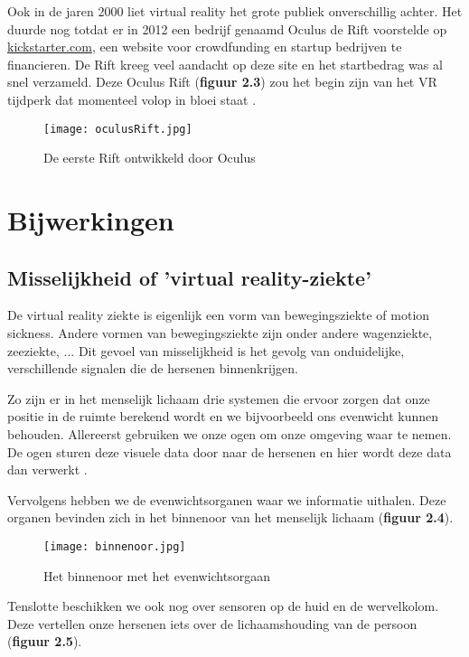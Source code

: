 Ook in de jaren 2000 liet virtual reality het grote publiek onverschillig achter. Het duurde nog totdat er in 2012 een bedrijf genaamd Oculus de Rift voorstelde op \href{https://www.kickstarter.com/}{kickstarter.com}, een website voor crowdfunding en startup bedrijven te financieren. De Rift kreeg veel aandacht op deze site en het startbedrag was al snel verzameld. Deze Oculus Rift (\textbf{figuur 2.3}) zou het begin zijn van het VR tijdperk dat momenteel volop in bloei staat \autocite{Society2019}.

\begin{figure}[h]
    \centering
    \texttt{[image: oculusRift.jpg]}
    \caption{De eerste Rift ontwikkeld door Oculus \autocite{Kumparak2014}}
\end{figure}

\section{Bijwerkingen}
\subsection{Misselijkheid of 'virtual reality-ziekte'}

De virtual reality ziekte is eigenlijk een vorm van bewegingsziekte of motion sickness. Andere vormen van bewegingsziekte zijn onder andere wagenziekte, zeeziekte, ... Dit gevoel van misselijkheid is het gevolg van onduidelijke, verschillende signalen die de hersenen binnenkrijgen.

Zo zijn er in het menselijk lichaam drie systemen die ervoor zorgen dat onze positie in de ruimte berekend wordt en we bijvoorbeeld ons evenwicht kunnen behouden.
Allereerst gebruiken we onze ogen om onze omgeving waar te nemen. De ogen sturen deze visuele data door naar de hersenen en hier wordt deze data dan verwerkt \autocite{Bovenij2019}.

Vervolgens hebben we de evenwichtsorganen waar we informatie uithalen. Deze organen bevinden zich in het binnenoor van het menselijk lichaam (\textbf{figuur 2.4}).

\begin{figure}[h]
    \centering
    \texttt{[image: binnenoor.jpg]}
    \caption{Het binnenoor met het evenwichtsorgaan \autocite{Utrecht2019}}
\end{figure}

Tenslotte beschikken we ook nog over sensoren op de huid en de wervelkolom. Deze vertellen onze hersenen iets over de lichaamshouding van de persoon (\textbf{figuur 2.5}).

